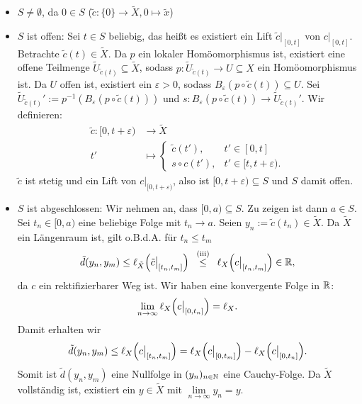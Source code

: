 \begin{beweis}
	\begin{itemize}
		\item $S \neq \emptyset$, da $0 \in S$ ($\tilde{c}\colon \{0\} \rightarrow \tilde{X}, 0 \mapsto \tilde{x}$)
		\item $S$ ist offen:
		Sei $t \in S$ beliebig, das heißt es existiert ein Lift $\tilde{c} \big|_{[0,t]}$ von $c \big|_{[0,t]}$.
		Betrachte $\tilde{c}(t) \in \tilde{X}$.
		Da $p$ ein lokaler Homöomorphismus ist, existiert eine offene Teilmenge $\tilde{U}_{\tilde{c}(t)} \subseteq \tilde{X}$, sodass $p \colon \tilde{U}_{\tilde{c}(t)} \rightarrow U \subseteq X$ ein Homöomorphismus ist.
		Da $U$ offen ist, existiert ein $\varepsilon > 0$, sodass $B_\varepsilon(p \circ \tilde{c}(t)) \subseteq U$.
		Sei $\tilde{U}_{\tilde{c}(t)}' := p^{-1}(B_\varepsilon(p \circ \tilde{c}(t)))$ und $s \colon B_\varepsilon(p \circ \tilde{c}(t)) \rightarrow \tilde{U}_{\tilde{c}(t)}'$.
		Wir definieren:
		\begin{align*}
			\tilde{c} \colon [0,t+\varepsilon) &\longrightarrow \tilde{X} \\
			t' &\longmapsto \begin{cases}
				\tilde{c}(t'), & t' \in [0,t] \\
				s \circ c(t'), & t' \in [t,t+\varepsilon).
			\end{cases}
		\end{align*}
		$\tilde{c}$ ist stetig und ein Lift von $c \big|_{[0,t+\varepsilon)}$, also ist $[0,t + \varepsilon) \subseteq S$ und $S$ damit offen. 
		\item $S$ ist abgeschlossen:
		Wir nehmen an, dass $[0,a) \subseteq S$.
		Zu zeigen ist dann $a \in S$.
		Sei $t_n \in [0,a)$ eine beliebige Folge mit $t_n \rightarrow a$.
		Seien $y_n := \tilde{c}(t_n) \in \tilde{X}$.
		Da $\tilde{X}$ ein Längenraum ist, gilt o.B.d.A. für $t_n \leq t_m$
		\[
			\tilde{d}(y_n,y_m) \leq \ell_{\tilde{X}} \enbrace*{\tilde{c}\big|_{[t_n,t_m]}} \stack{\text{(iii)}}{\leq} \ell_X \enbrace*{c \big|_{[t_n,t_m]}} \in \RR,
		\]
		da $c$ ein rektifizierbarer Weg ist.
		Wir haben eine konvergente Folge in $\mathbb{R}$:
		\[
			\lim\limits_{n \rightarrow \infty} \ell_X \enbrace*{c \big|_{[0,t_n]}} = \ell_X.
		\]
		Damit erhalten wir
		\[
			\tilde{d}(y_n,y_m) \leq \ell_X\enbrace*{c \big|_{[t_n,t_m]}} = \ell_X \enbrace*{c \big|_{[0,t_m]}} - \ell_X \enbrace*{c \big|_{[0,t_n]}}.
		\]
		Somit ist $\tilde{d}(y_n,y_m)$ eine Nullfolge in $(y_n)_{n \in \mathbb{N}}$ eine Cauchy-Folge.
		Da $\tilde{X}$ vollständig ist, existiert ein $y \in \tilde{X}$ mit $\lim\limits_{n \rightarrow \infty} y_n = y$.

\end{itemize}
\end{beweis}
